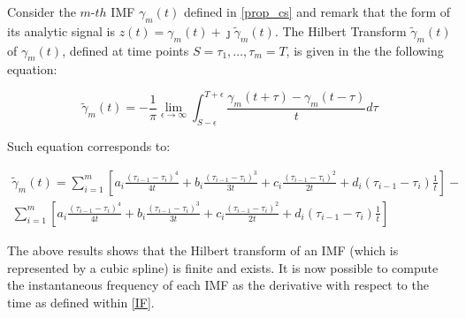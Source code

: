 \begin{Proposition}
Consider the $m$-$th$ IMF $\gamma_m(t)$ defined in \ref{prop_cs} and remark that the form of its analytic signal is $z(t) = \gamma_m(t) + \jmath \tilde{\gamma}_m (t)$. The Hilbert Transform $\tilde{\gamma}_m (t)$ of $\gamma_m (t)$, defined at time points $S=\tau_1, \dots, \tau_m=T$, is given in the the following equation:

\begin{equation}
\tilde{\gamma}_m (t) = -\frac{1}{\pi} \lim_{\epsilon \rightarrow \infty} \int_{S- \epsilon}^{T+\epsilon} \frac{\gamma_m \left( t + \tau \right) - \gamma_m \left( t - \tau \right)}{t} d \tau
\end{equation}

Such equation corresponds to:

\begin{equation}
\begin{split}
\tilde{\gamma}_m (t) = \sum_{i = 1}^m \left[ a_i \frac{ \left( \tau_{i-1} - \tau_i \right)^4 }{4t} + b_i \frac{ \left( \tau_{i-1} - \tau_i \right)^3 }{3t} + c_i \frac{ \left( \tau_{i-1} - \tau_i \right)^2 }{2t} + d_i \left( \tau_{i-1} - \tau_{i} \right) \frac{1}{t}  \right] - \\
 \sum_{i=1}^m \left[  a_i \frac{ \left( \tau_{i-1} - \tau_i \right)^4 }{4t} + b_i \frac{ \left( \tau_{i-1} - \tau_i \right)^3 }{3t} + c_i \frac{ \left( \tau_{i-1} - \tau_i \right)^2 }{2t} + d_i \left( \tau_{i-1} - \tau_{i} \right) \frac{1}{t} \right]
\end{split} 
\end{equation}

\end{Proposition} 

%
The above results shows that the Hilbert transform of an IMF (which is represented by a cubic spline) is finite and exists. It is now possible to compute the instantaneous frequency of each IMF as the derivative with respect to the time as defined within \ref{IF}.\\

